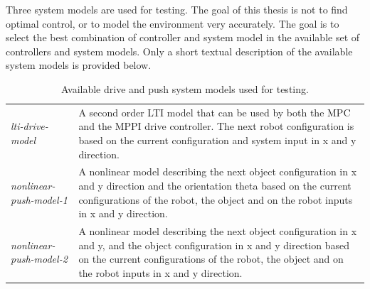 Three system models are used for testing. The goal of this thesis is not to find optimal control, or to model the environment very accurately. The goal is to select the best combination of controller and system model in the available set of controllers and system models. Only a short textual description of the available system models is provided below.\bs


\noindent
\begin{table}[H]
\centering
\begin{tabular}%
  {>{\raggedright\arraybackslash}p{}%
   >{\raggedright\arraybackslash}p{}}
\textit{lti-drive-model} & A second order \ac{LTI} model that can be used by both the \ac{MPC} and the \ac{MPPI} drive controller. The next robot configuration is based on the current configuration and system input in \gls{x} and \gls{y} direction. \\
\textit{nonlinear-push-model-1} & A nonlinear model describing the next object configuration in \gls{x} and \gls{y} direction and the orientation \gls{theta} based on the current configurations of the robot, the object and on the robot inputs in \gls{x} and \gls{y} direction.\\
\textit{nonlinear-push-model-2} & A nonlinear model describing the next object configuration in \gls{x} and \gls{y}, and the object configuration in \gls{x} and \gls{y} direction based on the current configurations of the robot, the object and on the robot inputs in \gls{x} and \gls{y} direction.\\
\end{tabular}
\caption{Available drive and push system models used for testing.}\label{table:available_system_models}
\end{table}




